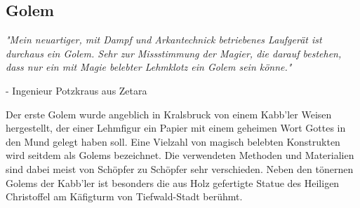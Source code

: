 \documentclass[10pt,twoside,twocolumn,openany]{book}
\begin{document}
\begin{multicols}{2}
	

	
	\subsection{Golem}
	\textit{"Mein neuartiger, mit Dampf und Arkantechnick betriebenes Laufgerät ist durchaus ein Golem. Sehr zur Missstimmung der Magier, die darauf bestehen, dass nur ein mit Magie belebter Lehmklotz ein Golem sein könne."}
	\begin{flushright}
		- Ingenieur Potzkraus aus Zetara
	\end{flushright}
	Der erste Golem wurde angeblich in Kralsbruck von einem Kabb'ler Weisen hergestellt, der einer Lehmfigur ein Papier mit einem geheimen Wort Gottes in den Mund gelegt haben soll. Eine Vielzahl von magisch belebten Konstrukten wird seitdem als Golems bezeichnet. Die verwendeten Methoden und Materialien sind dabei meist von Schöpfer zu Schöpfer sehr verschieden. Neben den tönernen Golems der Kabb'ler ist besonders die aus Holz gefertigte Statue des Heiligen Christoffel am Käfigturm von Tiefwald-Stadt berühmt.
	
	
	
\end{multicols}
\end{document}
